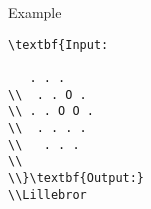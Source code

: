 Example
\begin{verbatim}
\textbf{Input:

   . . .
\\  . . O .
\\ . . O O .
\\  . . . .
\\   . . .
\\
\\}\textbf{Output:}
\\Lillebror\end{verbatim}